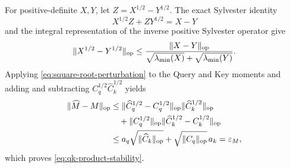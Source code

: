 For positive-definite $X,Y$, let $Z=X^{1/2}-Y^{1/2}$.  The exact Sylvester
identity
\begin{equation}
 X^{1/2}Z+ZY^{1/2}=X-Y
\end{equation}
and the integral representation of the inverse positive Sylvester operator
give
\begin{equation}
 \|X^{1/2}-Y^{1/2}\|_{\mathrm{op}}
 \le
 \frac{\|X-Y\|_{\mathrm{op}}}
 {\sqrt{\lambda_{\min}(X)}+\sqrt{\lambda_{\min}(Y)}}.
 \label{eq:square-root-perturbation}
\end{equation}
Applying \cref{eq:square-root-perturbation} to the Query and Key moments and
adding and subtracting $C_q^{1/2}\widehat C_k^{1/2}$ yields
\begin{align}
 \|\widehat M-M\|_{\mathrm{op}}
 &\le
 \|\widehat C_q^{1/2}-C_q^{1/2}\|_{\mathrm{op}}
 \|\widehat C_k^{1/2}\|_{\mathrm{op}}\\
 &\quad+
 \|C_q^{1/2}\|_{\mathrm{op}}
 \|\widehat C_k^{1/2}-C_k^{1/2}\|_{\mathrm{op}}\\
 &\le
 a_q\sqrt{\|\widehat C_k\|_{\mathrm{op}}}
 +\sqrt{\|C_q\|_{\mathrm{op}}}\,a_k
 =\varepsilon_M,
\end{align}
which proves \cref{eq:qk-product-stability}.


